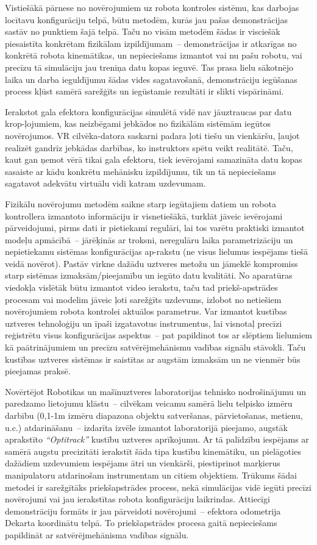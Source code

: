 \documentclass[12pt, a4paper]{article}
\numberwithin{equation}{section} %
\begin{document}
Vistiešākā pārnese no novērojumiem uz robota kontroles sistēmu, kas darbojas locītavu konfigurāciju telpā, būtu metodēm, kurās jau pašas demonstrācijas sastāv no punktiem šajā telpā. Taču no visām metodēm šādas ir visciešāk piesaistīta konkrētam fizikālam izpildījumam~-- demonstrācijas ir atkarīgas no konkrētā robota kinemātikas, un nepieciešams izmantot vai nu pašu robotu, vai precīzu tā simulāciju jau treniņa datu kopas ieguvē. Tas prasa lielu sākotnējo laika un darba ieguldījumu šādas vides sagatavošanā, demonstrāciju iegūšanas process kļūst samērā sarežģīts un iegūstamie rezultāti ir slikti vispārināmi.

Ierakstot gala efektora konfigurācijas simulētā vidē nav jāuztraucas par datu krop-ļojumiem, kas neizbēgami jebkādos no fizikālām sistēmām iegūtos novērojumos. VR cilvēka-datora saskarni padara ļoti tiešu un vienkāršu, ļaujot realizēt gandrīz jebkādas darbības, ko instruktors spētu veikt realitātē. Taču, kaut gan ņemot vērā tikai gala efektoru, tiek ievērojami samazināta datu kopas sasaiste ar kādu konkrētu mehānisku izpildījumu, tik un tā nepieciešams sagatavot adekvātu virtuālu vidi katram uzdevumam.

Fizikālu novērojumu metodēm saikne starp iegūtajiem datiem un robota kontrollera izmantoto informāciju ir visnetiešākā, turklāt jāveic ievērojami pārveidojumi, pirms dati ir pietiekami regulāri, lai tos varētu praktiski izmantot modeļu apmācībā~-- jārēķinās ar troksni, neregulāru laika parametrizāciju un nepietiekamu sistēmas konfigurācijas ap-rakstu (ne visus lielumus iespējams tiešā veidā novērot). Pastāv virkne dažādu uztveres metožu un jāmeklē kompromiss starp sistēmas izmaksām/pieejamību un iegūto datu kvalitāti. No aparatūras viedokļa vislētāk būtu izmantot video ierakstu, taču tad priekš-apstrādes procesam vai modelim jāveic ļoti sarežģīts uzdevums, izlobot no netiešiem novērojumiem robota kontrolei aktuālos parametrus. Var izmantot kustības uztveres tehnoloģiju un īpaši izgatavotus instrumentus, lai visnotaļ precīzi reģistrētu visus konfigurācijas aspektus~-- pat papildinot tos ar slēptiem lielumiem kā paātrinājumiem un precīzu satvērējmehānismu vadības signālu stāvokli. Taču kustības uztveres sistēmas ir saistītas ar augstām izmaksām un ne vienmēr būs pieejamas praksē.

Novērtējot Robotikas un mašīnuztveres laboratorijas tehnisko nodrošinājumu un paredzamo lietojumu klāstu~-- cilvēkam veicamu samērā lielu telpisko izmēru darbību (0,1-1m izmēru diapazona objektu satveršanas, pārvietošanas, metienu, u.c.) atdarināšanu~-- izdarīta izvēle izmantot laboratorijā pieejamo, augstāk aprakstīto \textit{``Optitrack''} kustību uztveres aprīkojumu. Ar tā palīdzību iespējams ar samērā augstu precizitāti ierakstīt šāda tipa kustību kinemātiku, un pielāgoties dažādiem uzdevumiem iespējams ātri un vienkārši, piestiprinot marķierus manipulatoru atdarinošam instrumentam un citiem objektiem. Trūkums šādai metodei ir sarežgītāks priekšapstrādes process, nekā simulācijas vidē iegūti precīzi novērojumi vai jau ierakstītas robota konfigurāciju laikrindas. Attiecīgi demonstrāciju formāts ir jau pārveidoti novērojumi~-- efektora odometrija Dekarta koordinātu telpā. To priekšapstrādes procesa gaitā nepieciešams papildināt ar satvērējmehānisma vadības signālu.
\end{document}

